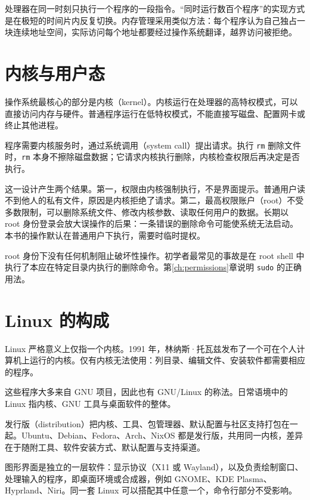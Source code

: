 处理器在同一时刻只执行一个程序的一段指令。“同时运行数百个程序”的实现方式是在极短的时间片内反复切换。内存管理采用类似方法：每个程序认为自己独占一块连续地址空间，实际访问每个地址都要经过操作系统翻译，越界访问被拒绝。

\section{内核与用户态}

操作系统最核心的部分是内核（kernel）。内核运行在处理器的高特权模式，可以直接访问内存与硬件。普通程序运行在低特权模式，不能直接写磁盘、配置网卡或终止其他进程。

程序需要内核服务时，通过系统调用（system call）提出请求。执行 \texttt{rm} 删除文件时，\texttt{rm} 本身不擦除磁盘数据；它请求内核执行删除，内核检查权限后再决定是否执行。

这一设计产生两个结果。第一，权限由内核强制执行，不是界面提示。普通用户读不到他人的私有文件，原因是内核拒绝了请求。第二，最高权限账户（root）不受多数限制，可以删除系统文件、修改内核参数、读取任何用户的数据。长期以 root 身份登录会放大误操作的后果：一条错误的删除命令可能使系统无法启动。本书的操作默认在普通用户下执行，需要时临时提权。

\begin{warnbox}
root 身份下没有任何机制阻止破坏性操作。初学者最常见的事故是在 root shell 中执行了本应在特定目录内执行的删除命令。第\ref{ch:permissions}章说明 \texttt{sudo} 的正确用法。
\end{warnbox}

\section{Linux 的构成}

Linux 严格意义上仅指一个内核。1991 年，林纳斯·托瓦兹发布了一个可在个人计算机上运行的内核。仅有内核无法使用：列目录、编辑文件、安装软件都需要相应的程序。

这些程序大多来自 GNU 项目，因此也有 GNU/Linux 的称法。日常语境中的 Linux 指内核、GNU 工具与桌面软件的整体。

发行版（distribution）把内核、工具、包管理器、默认配置与社区支持打包在一起。Ubuntu、Debian、Fedora、Arch、NixOS 都是发行版，共用同一内核，差异在于随附工具、软件安装方式、默认配置与支持渠道。

\begin{notebox}[图形界面不属于内核]
图形界面是独立的一层软件：显示协议（X11 或 Wayland），以及负责绘制窗口、处理输入的程序，即桌面环境或合成器，例如 GNOME、KDE Plasma、Hyprland、Niri。同一套 Linux 可以搭配其中任意一个，命令行部分不受影响。
\end{notebox}

